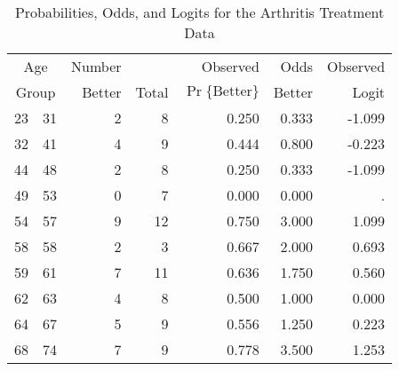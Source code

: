 \begin{table}[htb]
 \caption{Probabilities, Odds, and Logits for the Arthritis Treatment Data}\label{tab:arthlogit}
 \begin{center}
 \begin{tabular}{r@{ -- }l rrrrr}
 \hline
  \multicolumn{2}{c}{Age}
		       & Number &       & Observed   & Odds   & Observed \\ 
  \multicolumn{2}{c}{Group} 
             & Better & Total & $\Pr\{\mbox{Better}\}$ & Better & Logit \\ \hline
  23  &  31  &    2  &   8  &  0.250  &  0.333  &  -1.099 \\ 
  32  &  41  &    4  &   9  &  0.444  &  0.800  &  -0.223 \\ 
  44  &  48  &    2  &   8  &  0.250  &  0.333  &  -1.099 \\ 
  49  &  53  &    0  &   7  &  0.000  &  0.000  &  . \\ 
  54  &  57  &    9  &  12  &  0.750  &  3.000  &   1.099 \\ 
  58  &  58  &    2  &   3  &  0.667  &  2.000  &   0.693 \\ 
  59  &  61  &    7  &  11  &  0.636  &  1.750  &   0.560 \\ 
  62  &  63  &    4  &   8  &  0.500  &  1.000  &   0.000 \\ 
  64  &  67  &    5  &   9  &  0.556  &  1.250  &   0.223 \\ 
  68  &  74  &    7  &   9  &  0.778  &  3.500  &   1.253 \\ 
 \hline
 \end{tabular}
 \end{center}
\end{table}
